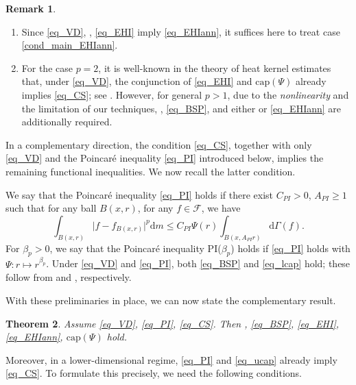\documentclass[11pt,a4paper]{article}
\numberwithin{equation}{section}
\theoremstyle{plain}
\newtheorem{theorem}{Theorem}[section]
\theoremstyle{definition}
\newtheorem{remark}[theorem]{Remark}
\begin{document}
\begin{remark}
\begin{enumerate}[label=(\arabic*)]
\item Since \ref{eq_VD}, \hyperlink{eq_LLC}{}, \ref{eq_EHI} imply \ref{eq_EHIann}, it suffices here to treat case \ref{cond_main_EHIann}.
\item For the case $p=2$, it is well-known in the theory of heat kernel estimates that, under \ref{eq_VD}, the conjunction of \ref{eq_EHI} and \hyperlink{eq_cap}{$\text{cap}(\Psi)$} already implies \ref{eq_CS}; see \cite[THEOREM 1.2]{GHL15}. However, for general $p>1$, due to the \emph{nonlinearity} and the limitation of our techniques, \hyperlink{eq_LSC}{}, \ref{eq_BSP}, and either \hyperlink{eq_LLC}{} or \ref{eq_EHIann} are additionally required.
\end{enumerate}
\end{remark}

In a complementary direction, the condition \ref{eq_CS}, together with only \ref{eq_VD} and the Poincar\'e inequality \ref{eq_PI} introduced below, implies the remaining functional inequalities. We now recall the latter condition.

We say that the Poincar\'e inequality \ref{eq_PI} holds if there exist $C_{PI}>0$, $A_{PI}\ge1$ such that for any ball $B(x,r)$, for any $f\in\mathcal{F}$, we have
\begin{equation*}\label{eq_PI}\tag*{PI($\Psi$)}
\int_{B(x,r)}\lvert f-f_{B(x,r)}\rvert^p\mathrm{d} m\le C_{PI}\Psi(r)\int_{{B(x,A_{PI}r)}}\mathrm{d}\Gamma(f).
\end{equation*}
For $\beta_p>0$, we say that the Poincar\'e inequality \hypertarget{eq_PIbeta}{PI($\beta_p$)} holds if \ref{eq_PI} holds with $\Psi:r\mapsto r^{\beta_p}$. Under \ref{eq_VD} and \ref{eq_PI}, both \ref{eq_BSP} and \ref{eq_lcap} hold; these follow from \cite[Lemma 4.1]{Yan25c} and \cite[Lemma 5.1 (a)]{BB04}, respectively.

With these preliminaries in place, we can now state the complementary result.

\begin{theorem}\label{thm_main_conv}
Assume \ref{eq_VD}, \ref{eq_PI}, \ref{eq_CS}. Then \hyperlink{eq_LSC}{}, \ref{eq_BSP}, \ref{eq_EHI}, \ref{eq_EHIann}, \hyperlink{eq_cap}{$\text{cap}(\Psi)$} hold.
\end{theorem}

Moreover, in a lower-dimensional regime, \ref{eq_PI} and \ref{eq_ucap} already imply \ref{eq_CS}. To formulate this precisely, we need the following conditions.
\end{document}
